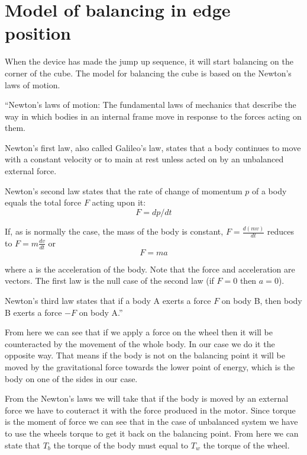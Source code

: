 \section{Model of balancing in edge position}

When the device has made the jump up sequence, it will start balancing on the corner of the cube.
The model for balancing the cube is based on the Newton's laws of motion.

``Newton's laws of motion: The fundamental laws of mechanics that describe the way in which bodies in an internal frame move in response to the forces acting on them.

Newton's first law, also called Galileo's law, states that a body continues to move with a constant velocity or to main at rest unless acted on by an unbalanced external force.

Newton's second law states that the rate of change of momentum $p$ of a body equals the total force $F$ acting upon it:
\begin{equation}
 F=dp/dt
\end{equation}

If, as is normally the case, the mass of the body is constant, $F=\frac{d(mv)}{dt}$ reduces to $F=m\frac{dv}{dt}$ or 
\begin{equation}
 F=ma
\end{equation}

where a is the acceleration of the body.
Note that the force and acceleration are vectors. The first law is the null case of the second law (if $F=0$ then $a=0$).

Newton's third law states that if a body A exerts a force $F$ on body B, then body B exerts a force $-F$ on body A.''\cite{clugston09}

From here we can see that if we apply a force on the wheel then it will be counteracted by the movement of the whole body.
In our case we do it the opposite way. 
That means if the body is not on the balancing point it will be moved by the gravitational force towards the lower point of energy, which is the body on one of the sides in our case.

From the Newton's laws we will take that if the body is moved by an external force we have to couteract it with the force produced in the motor.
Since torque is the moment of force \cite{clugston09} we can see that in the case of unbalanced system we have to use the wheels torque to get it back on the balancing point.
From here we can state that $T_{b}$ the torque of the body must equal to $T_{w}$ the torque of the wheel.

